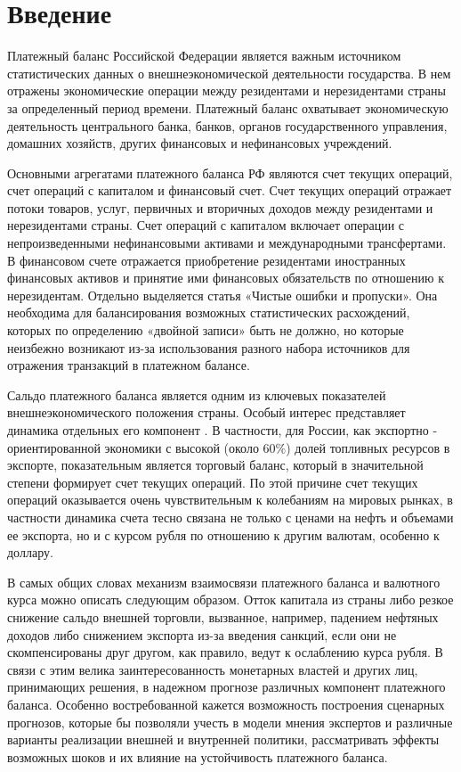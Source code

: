\documentclass[a4paper, 14pt]{extarticle}
\begin{document}
\newpage
\section{Введение}
Платежный баланс Российской Федерации является важным источником статистических данных о внешнеэкономической деятельности государства. 
В нем отражены экономические операции между резидентами и нерезидентами страны за определенный период времени. 
Платежный баланс охватывает экономическую деятельность центрального банка, банков, органов государственного управления, домашних хозяйств, других финансовых и нефинансовых учреждений.

Основными агрегатами платежного баланса РФ являются счет текущих операций, счет операций с капиталом и финансовый счет. 
Счет текущих операций отражает потоки товаров, услуг, первичных и вторичных доходов между резидентами и нерезидентами страны.  
Счет операций с капиталом включает операции с непроизведенными нефинансовыми активами и международными трансфертами. 
В финансовом счете отражается приобретение резидентами иностранных финансовых активов  и принятие ими финансовых обязательств по отношению к нерезидентам.
Отдельно выделяется статья «Чистые ошибки и пропуски».
Она необходима для балансирования возможных статистических расхождений, которых по определению «двойной записи» быть не должно, но которые неизбежно возникают из-за использования разного набора источников для отражения транзакций в платежном балансе.

Сальдо платежного баланса является одним из ключевых показателей внешнеэкономического положения страны. 
Особый интерес представляет динамика отдельных его компонент .
В частности, для России, как экспортно - ориентированной экономики с высокой (около $60 \%$) долей топливных ресурсов в экспорте, показательным является торговый баланс, который в значительной степени формирует счет текущих операций. 
По этой причине счет текущих операций оказывается очень чувствительным к колебаниям на мировых рынках, в частности динамика счета тесно связана не только с ценами на нефть и объемами ее  экспорта, но и с курсом рубля по отношению к другим валютам, особенно к доллару.

В самых общих словах механизм взаимосвязи платежного баланса и валютного курса можно описать следующим образом. 
Отток капитала из страны либо резкое снижение сальдо внешней торговли, вызванное, например, падением нефтяных доходов либо снижением экспорта из-за введения санкций, если они не скомпенсированы друг другом, как правило, ведут к ослаблению курса рубля. 
В связи с этим велика заинтересованность монетарных властей и других лиц, принимающих решения, в надежном прогнозе различных компонент платежного баланса.
Особенно востребованной кажется возможность построения сценарных прогнозов, которые бы позволяли учесть в модели мнения экспертов и различные варианты реализации внешней и внутренней политики, рассматривать эффекты возможных шоков и их влияние на устойчивость платежного баланса.
\end{document}

